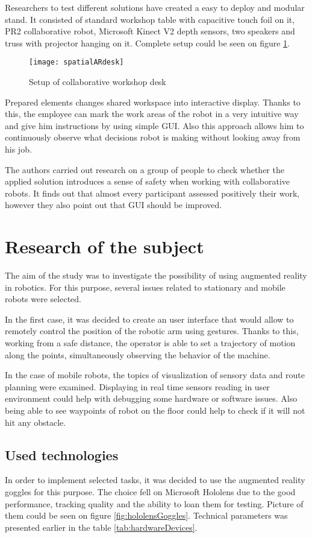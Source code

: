 \documentclass[printmode,en]{mgr}
\begin{document}
Researchers to test different solutions have created a easy to deploy and modular stand. It consisted of standard workshop table with capacitive touch foil on it, PR2 collaborative robot, Microsoft Kinect V2 depth sensors, two speakers and truss with projector hanging on it. Complete setup could be seen on figure \ref{fig:spatialARdesk}.

\begin{figure}[!ht]
  \centering
    \texttt{[image: spatialARdesk]}
  \caption{Setup of collaborative workshop desk \cite{SpatialARCollaborative}}
  \label{fig:spatialARdesk}
\end{figure}

Prepared elements changes shared workspace into interactive display. Thanks to this, the employee can mark the work areas of the robot in a very intuitive way and give him instructions by using simple GUI. Also this approach allows him to continuously observe what decisions robot is making without looking away from his job.

The authors carried out research on a group of people to check whether the applied solution introduces a sense of safety when working with collaborative robots. It finds out that almost every participant assessed positively their work, however they also point out that GUI should be improved.

\chapter{Research of the subject}
The aim of the study was to investigate the possibility of using augmented reality in robotics. For this purpose, several issues related to stationary and mobile robots were selected.

In the first case, it was decided to create an user interface that would allow to remotely control the position of the robotic arm using gestures. Thanks to this, working from a safe distance, the operator is able to set a trajectory of motion along the points, simultaneously observing the behavior of the machine.

In the case of mobile robots, the topics of visualization of sensory data and route planning were examined. Displaying in real time sensors reading in user environment could help with debugging some hardware or software issues. Also being able to see waypoints of robot on the floor could help to check if it will not hit any obstacle.

\section{Used technologies}
In order to implement selected tasks, it was decided to use the augmented reality goggles for this purpose. The choice fell on Microsoft Hololens due to the good performance, tracking quality and the ability to loan them for testing. Picture of them could be seen on figure \ref{fig:hololensGoggles}. Technical parameters was presented earlier in the table \ref{tab:hardwareDevices}.
\end{document}
